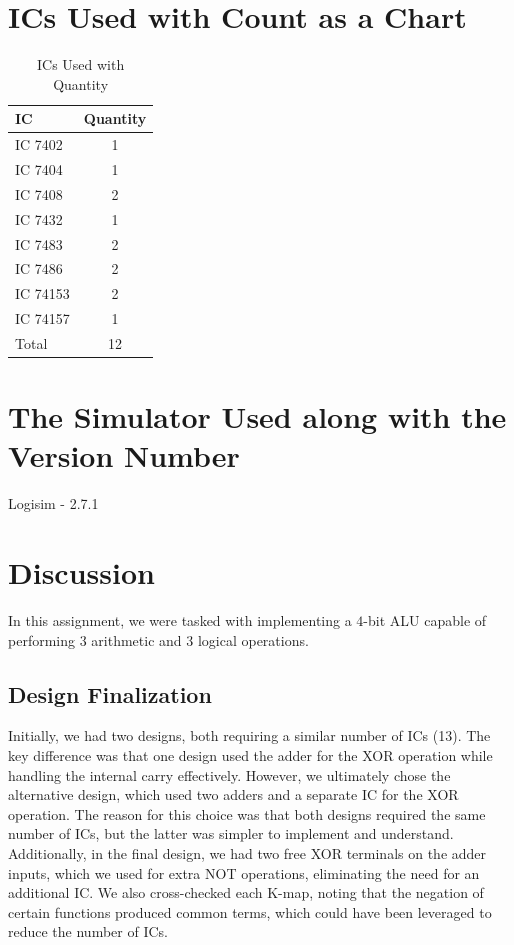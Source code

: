 \documentclass[12pt]{article}
\begin{document}
\section{\large{ICs Used with Count as a Chart}}
\begin{table}[H]
    \centering
    \begin{tabular}{lc}
         \textbf{IC} & \textbf{Quantity}  \\
         \hline
         \hline
         IC 7402 & 1  \\
         IC 7404 & 1  \\
         IC 7408 & 2  \\
         IC 7432 & 1  \\
         IC 7483 & 2  \\
         IC 7486 & 2  \\
         IC 74153 & 2  \\
         IC 74157 & 1  \\
         \hline
         Total & 12  \\
    \end{tabular}
    \caption{ICs Used with Quantity}
    \label{tab:ic_quantity}
\end{table}



\section{\large{The Simulator Used along with the Version Number}}
Logisim - 2.7.1

\newpage

\section{\large{Discussion}}

In this assignment, we were tasked with implementing a $4$-bit ALU capable of performing $3$ arithmetic and $3$ logical operations.

\subsection{Design Finalization}

Initially, we had two designs, both requiring a similar number of ICs (13). The key difference was that one design used the adder for the XOR operation while handling the internal carry effectively. However, we ultimately chose the alternative design, which used two adders and a separate IC for the XOR operation. The reason for this choice was that both designs required the same number of ICs, but the latter was simpler to implement and understand. Additionally, in the final design, we had two free XOR terminals on the adder inputs, which we used for extra NOT operations, eliminating the need for an additional IC. We also cross-checked each K-map, noting that the negation of certain functions produced common terms, which could have been leveraged to reduce the number of ICs.
\end{document}
